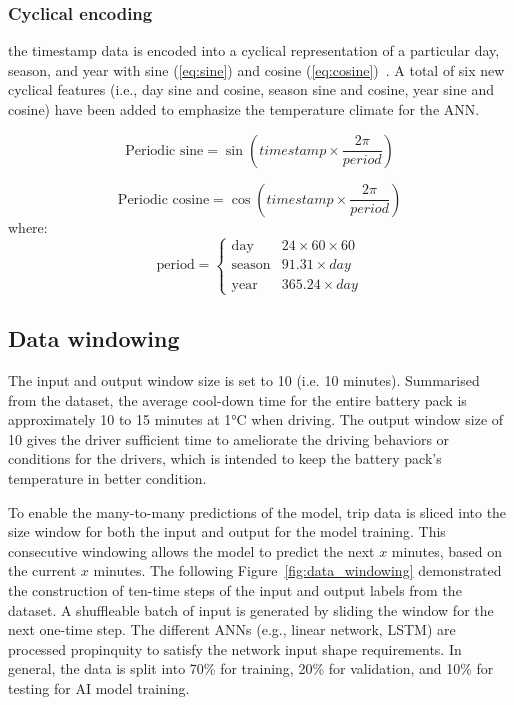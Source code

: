 \subsubsection{Cyclical encoding}
the timestamp data is encoded into a cyclical representation of a particular day, season, and year with sine (\ref{eq:sine}) and cosine (\ref{eq:cosine})~\cite{petnehazi2019recurrent}. 
A total of six new cyclical features (i.e., day sine and cosine, season sine and cosine, year sine and cosine) have been added to emphasize the temperature climate for the \gls{ANN}. 

\begin{equation}
\label{eq:sine}
\text{Periodic sine} = \sin \left( \textit{timestamp}\times\frac{2\pi}{\textit{period}} \right)
\end{equation}

\begin{equation}
\label{eq:cosine}
\text{Periodic cosine} = \cos \left( \textit{timestamp}\times\frac{2\pi}{\textit{period}} \right)
\end{equation}
where:
\[
\text{period} = \begin{cases}
  \text{day} & 24 \times 60 \times 60\\
  \text{season} & 91.31 \times \textit{day} \\
  \text{year} & 365.24 \times \textit{day}
\end{cases}
\]

\subsection{Data windowing}
The input and output window size is set to 10 (i.e. 10 minutes). 
Summarised from the dataset, the average cool-down time for the entire battery pack is approximately 10 to 15 minutes at 1°C when driving. 
The output window size of 10 gives the driver sufficient time to ameliorate the driving behaviors or conditions for the drivers, which is intended to keep the battery pack's temperature in better condition. 

To enable the many-to-many predictions of the model, trip data is sliced into the size window for both the input and output for the model training. 
This consecutive windowing allows the model to predict the next $\mathit{x}$ minutes, based on the current $\mathit{x}$ minutes. 
The following Figure~\ref{fig:data_windowing} demonstrated the construction of ten-time steps of the input and output labels from the dataset. 
A shuffleable batch of input is generated by sliding the window for the next one-time step. 
The different \glspl{ANN} (e.g., linear network, \gls{LSTM}) are processed propinquity to satisfy the network input shape requirements. 
In general, the data is split into 70\% for training, 20\% for validation, and 10\% for testing for \gls{AI} model training. 

